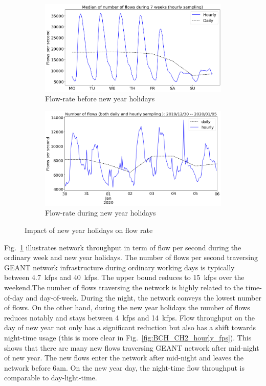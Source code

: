 \documentclass[10pt, journal, letterpaper]{IEEEtran}
\newcommand\figSzeMahdi{0.8}
\begin{document}
\begin{figure}[hbt!]
    \centering
    \begin{subfigure}{\figSzeMahdi\columnwidth}
          \centering
          \includegraphics[width=\columnwidth]{img/BCH_flowrate.png}
          \caption{Flow-rate before new year holidays}
          \label{fig:BCH_fps}
    \end{subfigure}
    \begin{subfigure}{\figSzeMahdi\columnwidth}
          \centering
          \includegraphics[width=\columnwidth]{img/CH2_flowrate.png}
          \caption{Flow-rate during new year holidays}
          \label{fig:CH_fps}
    \end{subfigure}
    \caption{Impact of new year holidays on flow rate}
    \label{fig:flowrate_BCH_CH}
\end{figure}
Fig.~\ref{fig:BCH_fps} illustrates network throughput in term of flow per second during the ordinary week and new year holidays. The number of flows per second traversing GEANT network infrastructure during ordinary working days is typically between 4.7~kfps and 40~kfps. The upper bound reduces to 15~kfps over the weekend.The number of flows traversing the network is highly related to the time-of-day and day-of-week. During the night, the network conveys the lowest number of flows. 
On the other hand, during the new year holidays the number of flows reduces notably and stays between 4~kfps and 14~kfps. Flow throughput on the day of new year not only has a significant reduction but also has a shift towards night-time usage (this is more clear in Fig.~\ref{fig:BCH_CH2_hourly_fps}). This shows that there are many new flows traversing GEANT network after mid-night of new year. The new flows enter the network after mid-night and leaves the network before 6am. On the new year day, the night-time flow throughput is comparable to day-light-time.
\end{document}
